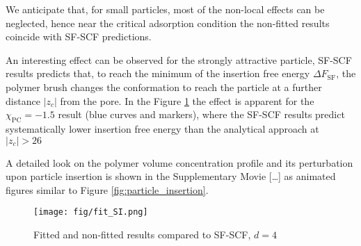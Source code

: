 \documentclass[10pt, a4paper]{article}
\begin{document}
\begin{multicols}{2}
We anticipate that, for small particles, most of the non-local effects can be neglected, hence near the critical adsorption condition the non-fitted results coincide with SF-SCF predictions.

An interesting effect can be observed for the strongly attractive particle, SF-SCF results predicts that, to reach the minimum of the insertion free energy $\Delta F_{\textrm{SF}}$, the polymer brush changes the conformation to reach the particle at a further distance $|z_c|$ from the pore.
In the Figure \ref{fig:fit_SI} the effect is apparent for the $\chi_{\textrm{PC}} =-1.5$ result (blue curves and markers), where the SF-SCF results predict systematically lower insertion free energy than the analytical approach at $|z_c| > 26$

A detailed look on the polymer volume concentration profile and its perturbation upon particle insertion is shown in the Supplementary Movie [\dots] as animated figures similar to Figure \ref{fig:particle_insertion}.

\begin{figure}[H]
    \centering
    \texttt{[image: fig/fit\_SI.png]}
    \caption{Fitted and non-fitted results compared to SF-SCF, $d=4$}
    \label{fig:fit_SI}
\end{figure}

\end{multicols}



\end{document}
